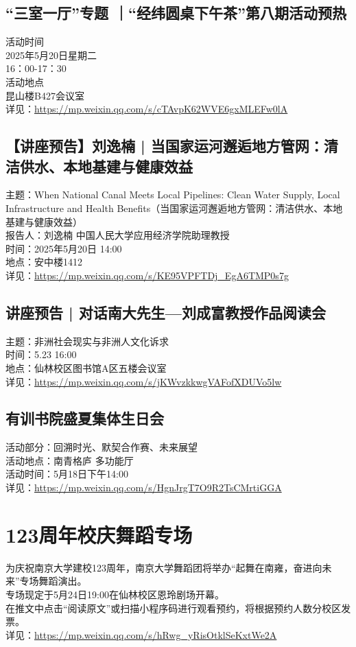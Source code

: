 \documentclass[letterpaper, 12pt]{article}
\begin{document}
\begin{multicols}{2}
\subsection{“三室一厅”专题 ｜“经纬圆桌下午茶”第八期活动预热} %
活动时间
\\2025年5月20日星期二
\\16：00-17：30
\\活动地点
\\昆山楼B427会议室
\\详见：\url{https://mp.weixin.qq.com/s/cTAvpK62WVE6gxMLEFw0lA}
\subsection{【讲座预告】刘逸楠 | 当国家运河邂逅地方管网：清洁供水、本地基建与健康效益} %
主题：When National Canal Meets Local Pipelines: Clean Water Supply, Local Infrastructure and Health Benefits（当国家运河邂逅地方管网：清洁供水、本地基建与健康效益）
\\报告人：刘逸楠 中国人民大学应用经济学院助理教授
\\时间：2025年5月20日 14:00
\\地点：安中楼1412 
\\详见：\url{https://mp.weixin.qq.com/s/KE95VPFTDj_EgA6TMP0s7g}

\subsection{讲座预告 | 对话南大先生—刘成富教授作品阅读会} %
主题：非洲社会现实与非洲人文化诉求
\\时间：5.23 16:00
\\地点：仙林校区图书馆A区五楼会议室
\\详见：\url{https://mp.weixin.qq.com/s/jKWvzkkwgVAFofXDUVo5lw}

\subsection{有训书院盛夏集体生日会} %
活动部分：回溯时光、默契合作赛、未来展望
\\活动地点：南青格庐 多功能厅
\\活动时间：5月18日下午14:00
\\详见：\url{https://mp.weixin.qq.com/s/HgnJrgT7O9R2TsCMrtiGGA}

\section{123周年校庆舞蹈专场} %
为庆祝南京大学建校123周年，南京大学舞蹈团将举办“起舞在南雍，奋进向未来”专场舞蹈演出。
\\专场现定于5月24日19:00在仙林校区恩玲剧场开幕。
\\在推文中点击“阅读原文”或扫描小程序码进行观看预约，将根据预约人数分校区发票。
\\详见：\url{https://mp.weixin.qq.com/s/hRwg_yRisOtklSeKxtWe2A}

\end{multicols}
\end{document}
